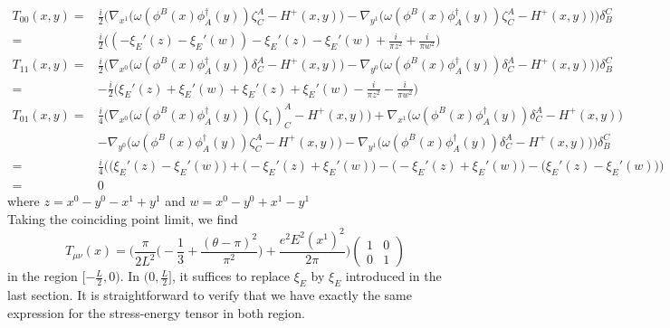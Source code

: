 \begin{equation}\label{vacuum-stressenergy}
\begin{split}
T_{00}(x,y) = 
& \frac{i}{2}\Big(\nabla_{x^1} \big( \omega(\phi^B(x) \phi^\dagger_A(y))\zeta^A_C - H^+(x,y) \big)
- \nabla_{y^1} \big( \omega( \phi^B(x) \phi^\dagger_A(y))\zeta^A_C - H^+(x,y) \big)
\Big)\delta_B^C  \\
= & \frac{i}{2} \big( (-\xi_E'(z) - \xi_E'(w)) - \xi_E'(z) - \xi_E'(w) + \frac{i}{\pi z^2} + \frac{i}{\pi w^2} \big)   \\
T_{11}(x,y) =
& \frac{i}{2}\Big(\nabla_{x^0} \big( \omega(\phi^B(x) \phi^\dagger_A(y))\delta^A_C - H^+(x,y) \big)
- \nabla_{y^0} \big( \omega( \phi^B(x) \phi^\dagger_A(y))\delta^A_C - H^+(x,y) \big)
\Big)\delta_B^C  \\
= & - \frac{i}{2}\big( \xi_E'(z) + \xi_E'(w) + \xi_E'(z) + \xi_E'(w) - \frac{i}{\pi z^2} - \frac{i}{\pi w^2}\big) \\
T_{01}(x,y) = 
& \frac{i}{4}\Big(\nabla_{x^0} \big( \omega(\phi^B(x) \phi^\dagger_A(y))(\zeta_1)^A_C - H^+(x,y) \big) + \nabla_{x^1} \big( \omega(\phi^B(x) \phi^\dagger_A(y))\delta^A_C - H^+(x,y) \big)  \\
& - \nabla_{y^0} \big( \omega( \phi^B(x) \phi^\dagger_A(y))\zeta^A_C - H^+(x,y) \big)
- \nabla_{y^1} \big( \omega( \phi^B(x) \phi^\dagger_A(y))\delta^A_C - H^+(x,y) \big)
\Big)\delta_B^C \\
= & \frac{i}{4}\Big( \big( \xi_E'(z) - \xi_E'(w) \big) + \big(- \xi_E'(z) + \xi_E'(w) \big) - \big( - \xi_E'(z) + \xi_E'(w) \big) - \big( \xi_E'(z) - \xi_E'(w) \big) \Big) \\
= & 0
\end{split}
\end{equation}
where $z = x^0 - y^0 - x^1 + y^1$ and $w = x^0 - y^0 + x^1 - y^1$ \\
Taking the coinciding point limit, we find
\begin{equation}\label{vacuum-T-with-field}
T_{\mu\nu}(x) = 
\bigg( \frac{\pi}{2L^2}\big( -\frac{1}{3} + \frac{(\theta - \pi)^2}{\pi^2}\big) + \frac{e^2E^2(x^1)^2}{2 \pi} \bigg)
\begin{pmatrix}
1 & 0 \\ 0 & 1
\end{pmatrix}
\end{equation}
in the region $[-\frac L 2, 0)$.
In $(0, \frac L 2 ]$, 
it suffices to replace $\xi_E$ by $\xi_E$ introduced in the last section.
It is straightforward to verify that we have exactly the same expression for the stress-energy tensor in both region.
